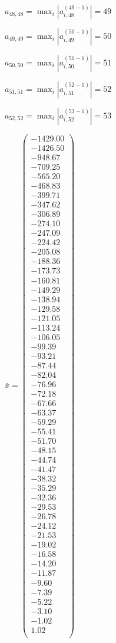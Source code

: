 \documentclass[a4paper,12pt]{article}
\begin{document}
$a _{ 48, 48 } =  \max _i |a _{ i, 48 } ^{ (49 - 1) } | = 49$

$a _{ 49, 49 } =  \max _i |a _{ i, 49 } ^{ (50 - 1) } | = 50$

$a _{ 50, 50 } =  \max _i |a _{ i, 50 } ^{ (51 - 1) } | = 51$

$a _{ 51, 51 } =  \max _i |a _{ i, 51 } ^{ (52 - 1) } | = 52$

$a _{ 52, 52 } =  \max _i |a _{ i, 52 } ^{ (53 - 1) } | = 53$

$\bar { x } = \begin{pmatrix}
-1429.00 \\
-1426.50 \\
-948.67 \\
-709.25 \\
-565.20 \\
-468.83 \\
-399.71 \\
-347.62 \\
-306.89 \\
-274.10 \\
-247.09 \\
-224.42 \\
-205.08 \\
-188.36 \\
-173.73 \\
-160.81 \\
-149.29 \\
-138.94 \\
-129.58 \\
-121.05 \\
-113.24 \\
-106.05 \\
-99.39 \\
-93.21 \\
-87.44 \\
-82.04 \\
-76.96 \\
-72.18 \\
-67.66 \\
-63.37 \\
-59.29 \\
-55.41 \\
-51.70 \\
-48.15 \\
-44.74 \\
-41.47 \\
-38.32 \\
-35.29 \\
-32.36 \\
-29.53 \\
-26.78 \\
-24.12 \\
-21.53 \\
-19.02 \\
-16.58 \\
-14.20 \\
-11.87 \\
-9.60 \\
-7.39 \\
-5.22 \\
-3.10 \\
-1.02 \\
1.02 \\
\end{pmatrix}
$
\end{document}
